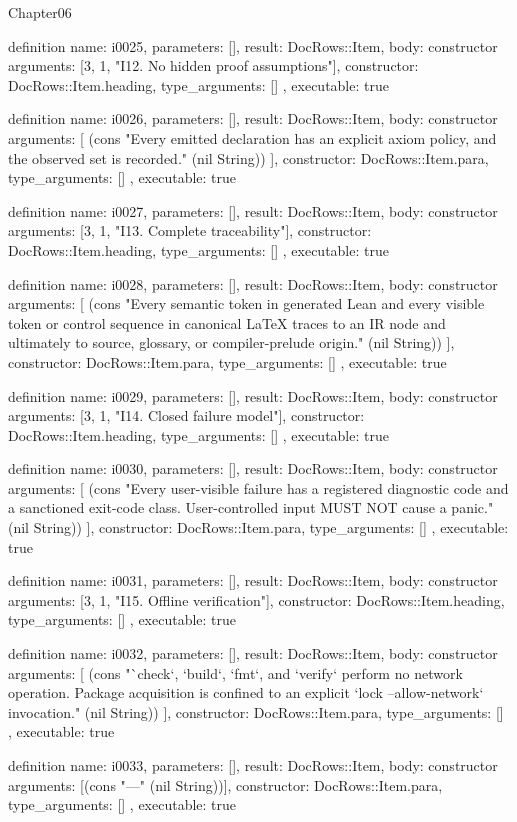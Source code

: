\begin{lexlean}{Chapter06}
\begin{semanticmodule}
definition{
  name: i0025,
  parameters: [],
  result: DocRows::Item,
  body: constructor{
    arguments: [3, 1, "I12. No hidden proof assumptions"],
    constructor: DocRows::Item.heading,
    type_arguments: []
  },
  executable: true
}

definition{
  name: i0026,
  parameters: [],
  result: DocRows::Item,
  body: constructor{
    arguments: [
      (cons "Every emitted declaration has an explicit axiom policy, and the observed set is recorded." (nil String))
    ],
    constructor: DocRows::Item.para,
    type_arguments: []
  },
  executable: true
}

definition{
  name: i0027,
  parameters: [],
  result: DocRows::Item,
  body: constructor{
    arguments: [3, 1, "I13. Complete traceability"],
    constructor: DocRows::Item.heading,
    type_arguments: []
  },
  executable: true
}

definition{
  name: i0028,
  parameters: [],
  result: DocRows::Item,
  body: constructor{
    arguments: [
      (cons "Every semantic token in generated Lean and every visible token or control sequence in canonical LaTeX traces to an IR node and ultimately to source, glossary, or compiler-prelude origin." (nil String))
    ],
    constructor: DocRows::Item.para,
    type_arguments: []
  },
  executable: true
}

definition{
  name: i0029,
  parameters: [],
  result: DocRows::Item,
  body: constructor{
    arguments: [3, 1, "I14. Closed failure model"],
    constructor: DocRows::Item.heading,
    type_arguments: []
  },
  executable: true
}

definition{
  name: i0030,
  parameters: [],
  result: DocRows::Item,
  body: constructor{
    arguments: [
      (cons "Every user-visible failure has a registered diagnostic code and a sanctioned exit-code class. User-controlled input MUST NOT cause a panic." (nil String))
    ],
    constructor: DocRows::Item.para,
    type_arguments: []
  },
  executable: true
}

definition{
  name: i0031,
  parameters: [],
  result: DocRows::Item,
  body: constructor{
    arguments: [3, 1, "I15. Offline verification"],
    constructor: DocRows::Item.heading,
    type_arguments: []
  },
  executable: true
}

definition{
  name: i0032,
  parameters: [],
  result: DocRows::Item,
  body: constructor{
    arguments: [
      (cons "`check`, `build`, `fmt`, and `verify` perform no network operation. Package acquisition is confined to an explicit `lock --allow-network` invocation." (nil String))
    ],
    constructor: DocRows::Item.para,
    type_arguments: []
  },
  executable: true
}

definition{
  name: i0033,
  parameters: [],
  result: DocRows::Item,
  body: constructor{
    arguments: [(cons "---" (nil String))],
    constructor: DocRows::Item.para,
    type_arguments: []
  },
  executable: true
}
\end{semanticmodule}
\end{lexlean}

